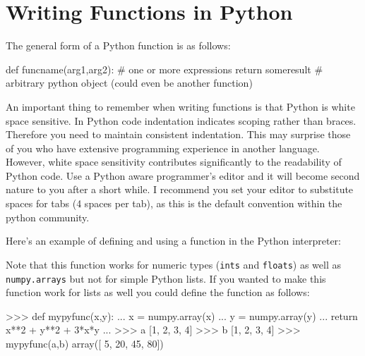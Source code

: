 
\section{Writing Functions in Python}

The general form of a Python function is as follows:
%
\begin{python}
def funcname(arg1,arg2):
    # one or more expressions
    return someresult # arbitrary python object (could even be another function)
\end{python}
%
An important thing to remember when writing functions is that Python is
white space sensitive. In Python code indentation indicates scoping
rather than braces. Therefore you need to maintain consistent
indentation. This may surprise those of you who have extensive
programming experience in another language. However, white space
sensitivity contributes significantly to the readability of Python code.
Use a Python aware programmer's editor and it will become second nature
to you after a short while. I recommend you set your editor to
substitute spaces for tabs (4 spaces per tab), as this is the default
convention within the python community.

Here's an example of defining and using a function in the Python
interpreter:
%
%
Note that this function works for numeric types (\lstinline!ints! and
\lstinline!floats!) as well as \lstinline!numpy.arrays! but not for
simple Python lists. If you wanted to make this function work for lists
as well you could define the function as follows:
%
\begin{python}
>>> def mypyfunc(x,y):
...     x = numpy.array(x)
...     y = numpy.array(y)
...     return x**2 + y**2 + 3*x*y
... 
>>> a
[1, 2, 3, 4]
>>> b
[1, 2, 3, 4]
>>> mypyfunc(a,b)
array([ 5, 20, 45, 80])
\end{python}

